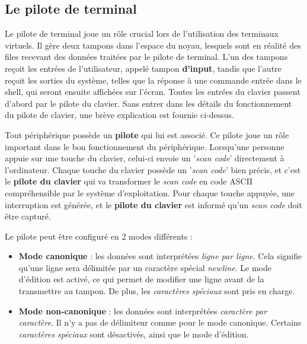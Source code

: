\subsection{Le pilote de terminal}
Le pilote de terminal joue un rôle crucial lors de l'utilisation des terminaux virtuels. Il gère deux tampons dans l'espace du noyau, lesquels sont en réalité des files recevant des données traitées par le pilote de terminal. L'un des tampons reçoit les entrées de l'utilisateur, appelé tampon \textbf{d'input}, tandis que l'autre reçoit les sorties du système, telles que la réponse à une commande entrée dans le shell, qui seront ensuite affichées sur l'écran. Toutes les entrées du clavier passent d'abord par le pilote du clavier. Sans entrer dans les détails du fonctionnement du pilote de clavier, une brève explication est fournie ci-dessus.

\begin{tcolorbox}[title=Une brève explication du pilote de clavier]
Tout périphérique possède un \textbf{pilote} qui lui est associé. Ce pilote joue un rôle important dans le bon fonctionnement du périphérique. Lorsqu'une personne appuie sur une touche du clavier, celui-ci envoie un '\textit{scan code}' directement à l'ordinateur. Chaque touche du clavier possède un '\textit{scan code}' bien précis, et c'est le \textbf{pilote du clavier} qui va transformer le \textit{scan code} en code ASCII compréhensible par le système d'exploitation. Pour chaque touche appuyée, une interruption est générée, et le \textbf{pilote du clavier} est informé qu'un \textit{scan code} doit être capturé.
\end{tcolorbox}

Le pilote peut être configuré en 2 modes différents :
\begin{itemize}
    \item \textbf{Mode canonique} : les données sont interprétées \textit{ligne par ligne}. Cela signifie qu'une ligne sera délimitée par un caractère spécial \textit{newline}. Le mode d'édition est activé, ce qui permet de modifier une ligne avant de la transmettre au tampon. De plus, les \textit{caractères spéciaux} sont pris en charge.
    \item \textbf{Mode non-canonique} : les données sont interprétées \textit{caractère par caractère}. Il n'y a pas de délimiteur comme pour le mode canonique. Certains \textit{caractères spéciaux} sont désactivés, ainsi que le mode d'édition.
\end{itemize}

\newpage


